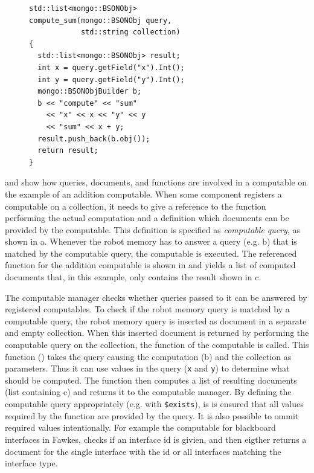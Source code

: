 \begin{figure}
  \vspace{-0.8cm}
\begin{lstlisting}[style=SmallCpp,
  caption={Function of a computable},
  label=lst:comp-func,
  framexleftmargin=5pt, xleftmargin=0pt,
 morekeywords={}, numbers=none]
std::list<mongo::BSONObj>
compute_sum(mongo::BSONObj query,
            std::string collection)
{
  std::list<mongo::BSONObj> result;
  int x = query.getField("x").Int();
  int y = query.getField("y").Int();
  mongo::BSONObjBuilder b;
  b << "compute" << "sum"
    << "x" << x << "y" << y
    << "sum" << x + y;
  result.push_back(b.obj());
  return result;
}
\end{lstlisting}
\vspace{-8mm}
\end{figure}

 and  show how queries,
documents, and functions are involved in a computable on the example
of an addition computable. When some component registers a computable
on a collection, it needs to give a reference to the function
performing the actual computation and a definition which documents can
be provided by the computable. This definition is specified as
\emph{computable query}, as shown in a. Whenever the
robot memory has to answer a query (e.g. b) that is
matched by the computable query, the computable is executed. The
referenced function for the addition computable is shown in
 and yields a list of computed documents that,
in this example, only contains the result shown in c.

The computable manager checks whether queries passed to it can be
answered by registered computables. To check if the robot memory query
is matched by a computable query, the robot memory query is inserted
as document in a separate and empty collection. When this inserted
document is returned by performing the computable query on the
collection, the function of the computable is called. This function
() takes the query causing the computation
(b) and the collection as parameters. Thus it can use
values in the query (\texttt{x} and \texttt{y}) to determine what
should be computed. The function then computes a list of resulting
documents (list containing c) and returns it to the
computable manager. By defining the computable query appropriately
(e.g. with \texttt{\$exists}), is is ensured that all values required
by the function are provided by the query. It is also possible to
ommit required values intentionally. For example the computable for
blackboard interfaces in Fawkes, checks if an interface id is givien,
and then eigther returns a document for the single interface with the
id or all interfaces matching the interface type.

